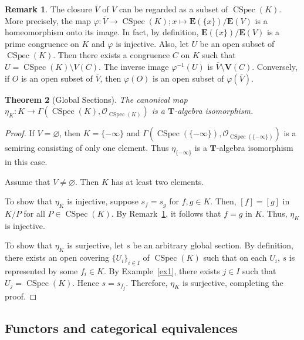 \documentclass[a4paper,12pt]{amsart}
\theoremstyle{plain}
\newtheorem{theorem}{Theorem}[section]
\theoremstyle{definition}
\newtheorem{remark}[theorem]{Remark}
\begin{document}
\begin{remark}
    \label{rem2}
The closure $\overline{V}$ of $V$ can be regarded as a subset of $\operatorname{CSpec}(K)$.
More precisely, the map $\varphi : \overline{V} \to \operatorname{CSpec}(K); x \mapsto \boldsymbol{E}(\{x\}) / \boldsymbol{E}(V)$ is a homeomorphism onto its image.
In fact, by definition, $\boldsymbol{E}(\{x\}) / \boldsymbol{E}(V)$ is a prime congruence on $K$ and $\varphi$ is injective.
Also, let $U$ be an open subset of $\operatorname{CSpec}(K)$.
Then there exists a congruence $C$ on $K$ such that $U = \operatorname{CSpec}(K) \setminus V(C)$.
The inverse image $\varphi^{-1}(U)$ is $\overline{V} \setminus \boldsymbol{V}(C)$.
Conversely, if $O$ is an open subset of $\overline{V}$, then $\varphi(O)$ is an open subset of $\varphi(\overline{V})$.
\end{remark}

\begin{theorem}[Global Sections]
    \label{thm1}
The canonical map $\eta_K : K \to \Gamma(\operatorname{CSpec}(K), \mathcal{O}_{\operatorname{CSpec}(K)})$ is a $\boldsymbol{T}$-algebra isomorphism.
\end{theorem}

\begin{proof}
If $V = \varnothing$, then $K = \{ -\infty \}$ and $\Gamma(\operatorname{CSpec}(\{-\infty\}), \mathcal{O}_{\operatorname{CSpec}(\{-\infty\})})$ is a semiring consisting of only one element.
Thus $\eta_{\{-\infty\}}$ is a $\boldsymbol{T}$-algebra isomorphism in this case.

Assume that $V \not= \varnothing$.
Then $K$ has at least two elements.

To show that $\eta_K$ is injective, suppose $s_f = s_g$ for $f, g \in K$. 
Then, $[f] = [g]$ in $K/P$ for all $P \in \operatorname{CSpec}(K)$. 
By Remark~\ref{rem2}, it follows that $f = g$ in $K$.
Thus, $\eta_K$ is injective.

To show that $\eta_K$ is surjective, let $s$ be an arbitrary global section.
By definition, there exists an open covering $\{U_i\}_{i \in I}$ of $\operatorname{CSpec}(K)$ such that on each $U_i$, $s$ is represented by some $f_i \in K$. 
By Example~\ref{ex1}, there exists $j \in I$ such that $U_j = \operatorname{CSpec}(K)$.
Hence $s = s_{f_j}$. 
Therefore, $\eta_K$ is surjective, completing the proof.
\end{proof}

\subsection{Functors and categorical equivalences}
    \label{subsection3.4}
\end{document}

